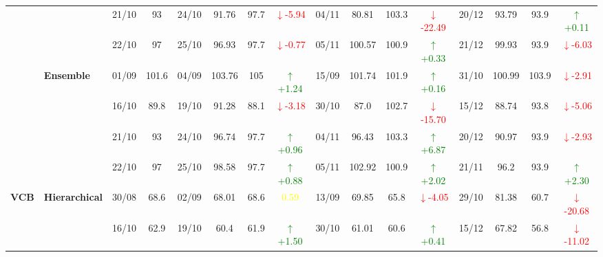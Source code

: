 \documentclass{ieeeaccess}
\begin{document}
{\begin{longtable}{llcc|cccc|cccc|cccc}
&
& 21/10 & 93 & 24/10 & 91.76 & 97.7 & \textcolor{red}{\(\downarrow\)-5.94} & 04/11 & 80.81 & 103.3 & \textcolor{red}{\(\downarrow\)-22.49} & 20/12 & 93.79 & 93.9 & \textcolor{green}{\(\uparrow\)+0.11} \\

&
& 22/10 & 97 & 25/10 & 96.93 & 97.7 & \textcolor{red}{\(\downarrow\)-0.77} & 05/11 & 100.57 & 100.9 & \textcolor{green}{\(\uparrow\)+0.33} & 21/12 & 99.93 & 93.9 & \textcolor{red}{\(\downarrow\)-6.03} \\
\cmidrule(lr){2-16}



& \textbf{Ensemble}
& 01/09 & 101.6 & 04/09 & 103.76 & 105 & \textcolor{green}{\(\uparrow\)+1.24} & 15/09 & 101.74 & 101.9 & \textcolor{green}{\(\uparrow\)+0.16} & 31/10 & 100.99 & 103.9 & \textcolor{red}{\(\downarrow\)-2.91} \\

&
& 16/10 & 89.8 & 19/10 & 91.28 & 88.1 & \textcolor{red}{\(\downarrow\)-3.18} & 30/10 & 87.0 & 102.7 & \textcolor{red}{\(\downarrow\)-15.70} & 15/12 & 88.74 & 93.8 & \textcolor{red}{\(\downarrow\)-5.06} \\

&
& 21/10 & 93 & 24/10 & 96.74 & 97.7 & \textcolor{green}{\(\uparrow\)+0.96} & 04/11 & 96.43 & 103.3 & \textcolor{green}{\(\uparrow\)+6.87} & 20/12 & 90.97 & 93.9 & \textcolor{red}{\(\downarrow\)-2.93} \\

&
& 22/10 & 97 & 25/10 & 98.58 & 97.7 & \textcolor{green}{\(\uparrow\)+0.88} & 05/11 & 102.92 & 100.9 & \textcolor{green}{\(\uparrow\)+2.02} & 21/11 & 96.2 & 93.9 & \textcolor{green}{\(\uparrow\)+2.30} \\
\midrule




\multirow{12}{*}{\textbf{VCB}} 
& \textbf{Hierarchical}
& 30/08 & 68.6 & 02/09 & 68.01 & 68.6 & \textcolor{yellow}{0.59} & 13/09 & 69.85 & 65.8 & \textcolor{red}{\(\downarrow\)-4.05} & 29/10 & 81.38 & 60.7 & \textcolor{red}{\(\downarrow\)-20.68} \\

&
& 16/10 & 62.9 & 19/10 & 60.4 & 61.9 & \textcolor{green}{\(\uparrow\)+1.50} & 30/10 & 61.01 & 60.6 & \textcolor{green}{\(\uparrow\)+0.41} & 15/12 & 67.82 & 56.8 & \textcolor{red}{\(\downarrow\)-11.02} \\


\end{longtable}}
\end{document}
